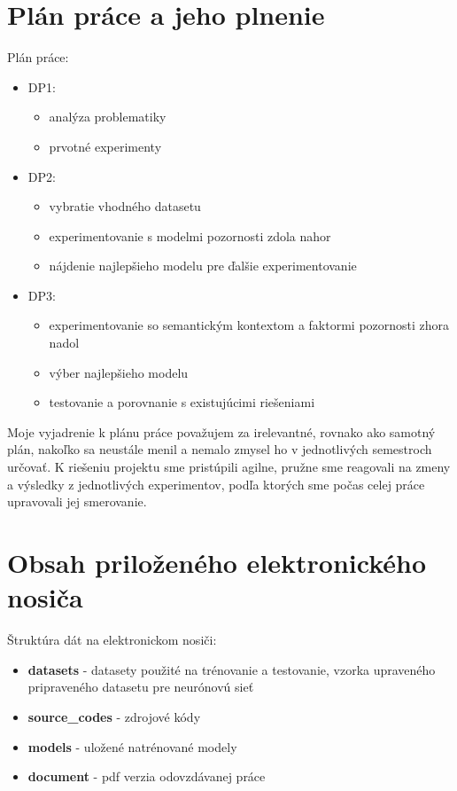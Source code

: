 \newpage
\null
\thispagestyle{empty}
\newpage
\pagestyle{plain}

\section{Plán práce a jeho plnenie}

Plán práce:

\begin{itemize}
	\item DP1:
		\begin{itemize}
			\item analýza problematiky
			\item prvotné experimenty
		\end{itemize}
	\item DP2:
		\begin{itemize}
			\item vybratie vhodného datasetu
			\item experimentovanie s modelmi pozornosti zdola nahor
			\item nájdenie najlepšieho modelu pre ďalšie experimentovanie
		\end{itemize}
	\item DP3:
		\begin{itemize}
			\item experimentovanie so semantickým kontextom a faktormi pozornosti zhora nadol
			\item výber najlepšieho modelu
			\item testovanie a porovnanie s existujúcimi riešeniami
		\end{itemize}
\end{itemize}

Moje vyjadrenie k plánu práce považujem za irelevantné, rovnako ako samotný plán, nakoľko sa neustále menil a nemalo zmysel ho v jednotlivých semestroch určovať. K riešeniu projektu sme pristúpili agilne, pružne sme reagovali na zmeny a výsledky z jednotlivých experimentov, podľa ktorých sme počas celej práce upravovali jej smerovanie. 

\newpage
\section{Obsah priloženého elektronického nosiča}

Štruktúra dát na elektronickom nosiči:

\begin{itemize}
	\item \textbf{datasets} - datasety použité na trénovanie a testovanie, vzorka upraveného pripraveného datasetu pre neurónovú sieť
	\item \textbf{source\_codes} - zdrojové kódy
	\item  \textbf{models} - uložené natrénované modely
	\item \textbf{document} - pdf verzia odovzdávanej práce
\end{itemize}

